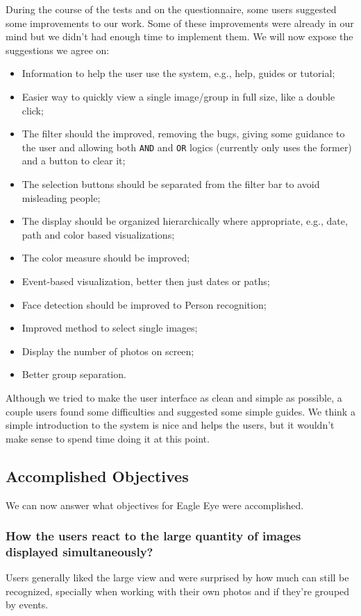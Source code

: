 During the course of the tests and on the questionnaire, some users suggested some improvements to our work. Some of these improvements were already in our mind but we didn't had enough time to implement them. We will now expose the suggestions we agree on:

\begin{itemize}
	\item Information to help the user use the system, e.g., help, guides or tutorial;
	\item Easier way to quickly view a single image/group in full size, like a double click;
	\item The filter should the improved, removing the bugs, giving some guidance to the user and allowing both \texttt{AND} and \texttt{OR} logics (currently only uses the former) and a button to clear it;
	\item The selection buttons should be separated from the filter bar to avoid misleading people;
	\item The display should be organized hierarchically where appropriate, e.g., date, path and color based visualizations;
	\item The color measure should be improved;
	\item Event-based visualization, better then just dates or paths;
	\item Face detection should be improved to Person recognition;
	\item Improved method to select single images;
	\item Display the number of photos on screen;
	\item Better group separation.
\end{itemize}

Although we tried to make the user interface as clean and simple as possible, a couple users found some difficulties and suggested some simple guides. We think a simple introduction to the system is nice and helps the users, but it wouldn't make sense to spend time doing it at this point.


\subsection{Accomplished Objectives} 

We can now answer what objectives for Eagle Eye were accomplished. 

\subsubsection{How the users react to the large quantity of images displayed simultaneously?}
Users generally liked the large view and were surprised by how much can still be recognized, specially when working with their own photos and if they're grouped by events. 

